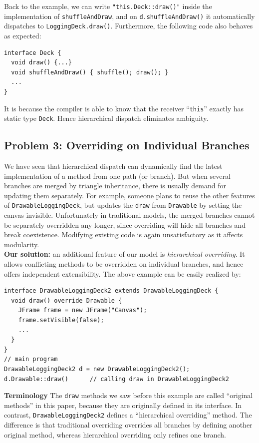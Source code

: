 Back to the example, we can write \lstinline|"this.Deck::draw()"| inside the implementation of \lstinline|shuffleAndDraw|, and on \lstinline|d.shuffleAndDraw()| it automatically dispatches to \lstinline|LoggingDeck.draw()|. Furthermore, the following code
also behaves as expected:
\vspace{3pt}\begin{lstlisting}
interface Deck {
  void draw() {...}
  void shuffleAndDraw() { shuffle(); draw(); }
  ...
}
\end{lstlisting}\vspace{3pt}
It is because the compiler is able to know that the receiver ``\lstinline|this|'' exactly has static type \lstinline|Deck|. Hence hierarchical dispatch eliminates ambiguity.

\subsection{Problem 3: Overriding on Individual Branches}\label{subsec:partialoverrides}

We have seen that hierarchical dispatch can dynamically find the latest implementation of a method from one path (or branch). But when
several branches are merged by triangle inheritance, there is usually demand for updating them separately. For example, someone plans to
reuse the other features of \lstinline|DrawableLoggingDeck|, but updates the \lstinline|draw| from \lstinline|Drawable| by setting the canvas
invisible. Unfortunately in traditional models, the merged branches cannot be separately overridden any longer, since overriding
will hide all branches and break coexistence. Modifying existing code is again unsatisfactory as it affects modularity.\\

\noindent\textbf{Our solution:} an additional feature of our model is \textit{hierarchical overriding}. It allows conflicting methods
to be overridden on individual branches, and hence offers independent extensibility. The above example can be easily realized by:
\vspace{3pt}\begin{lstlisting}
interface DrawableLoggingDeck2 extends DrawableLoggingDeck {
  void draw() override Drawable {
    JFrame frame = new JFrame("Canvas");
    frame.setVisible(false);
    ...
  }
}
// main program
DrawableLoggingDeck2 d = new DrawableLoggingDeck2();
d.Drawable::draw()      // calling draw in DrawableLoggingDeck2
\end{lstlisting}\vspace{3pt}
\textbf{Terminology} The \lstinline|draw| methods we saw before this example are called ``original methods'' in this paper, because they are originally defined in its interface.
In contrast, \lstinline|DrawableLoggingDeck2| defines a ``hierarchical overriding'' method. The difference is that traditional overriding overrides all branches by defining another original method, whereas hierarchical overriding only refines one branch.

